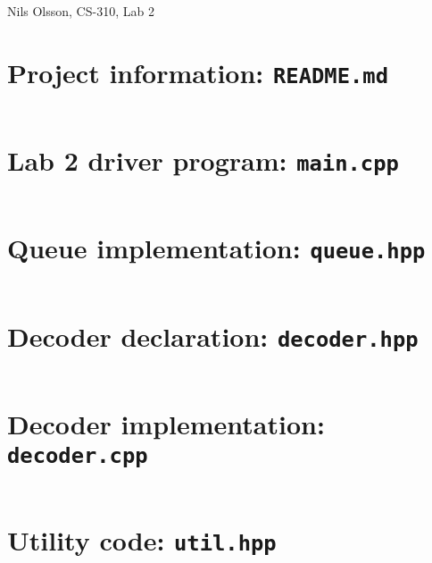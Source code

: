 \documentclass{article}
\begin{document}
\begin{center}
    Nils Olsson, CS-310, Lab 2
\end{center}
\hrulefill{}

\section*{Project information: \texttt{README.md}}
\inputminted{md}{README.md}

\section*{Lab 2 driver program: \texttt{main.cpp}}
\inputminted{cpp}{src/main.cpp}

\section*{Queue implementation: \texttt{queue.hpp}}
\inputminted{cpp}{src/queue.hpp}

\section*{Decoder declaration: \texttt{decoder.hpp}}
\inputminted{cpp}{src/decoder.hpp}

\section*{Decoder implementation: \texttt{decoder.cpp}}
\inputminted{cpp}{src/decoder.cpp}

\section*{Utility code: \texttt{util.hpp}}
\inputminted{cpp}{src/util.hpp}
\end{document}

